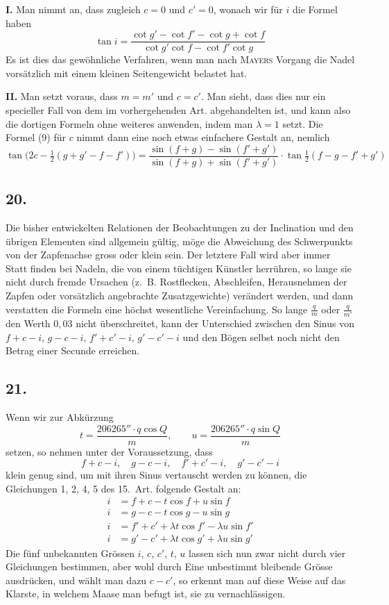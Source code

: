 \documentclass[12pt,a4paper]{article}
\begin{document}
\textbf{I.} Man nimmt an, dass zugleich $c = 0$ und $c' = 0$, wonach wir für $i$ die Formel haben
\[ \tan i = \frac{\cot g' - \cot f' - \cot g + \cot f}{\cot g' \cot f - \cot f' \cot g} \]
Es ist dies das gewöhnliche Verfahren, wenn man nach \textsc{Mayers} Vorgang die Nadel vorsätzlich mit einem kleinen Seitengewicht belastet hat.

\textbf{II.} Man setzt voraus, dass $m = m'$ und $c = c'$. Man sieht, dass dies nur ein specieller Fall von dem im vorhergehenden Art. abgehandelten ist, und kann also die dortigen Formeln ohne weiteres anwenden, indem man $\lambda = 1$ setzt. Die Formel (9) für $c$ nimmt dann eine noch etwas einfachere Gestalt an, nemlich
\[ \tan\bigl(2c - \tfrac{1}{2}(g + g' - f - f')\bigr) = \frac{\sin(f + g) - \sin(f' + g')}{\sin(f + g) + \sin(f' + g')} \cdot \tan\tfrac{1}{2}(f - g - f' + g') \]

\subsection*{20.}
Die bisher entwickelten Relationen der Beobachtungen zu der Inclination und den übrigen Elementen sind allgemein gültig, möge die Abweichung des Schwerpunkts von der Zapfenachse gross oder klein sein. Der letztere Fall wird aber immer Statt finden bei Nadeln, die von einem tüchtigen Künstler herrühren, so lange sie nicht durch fremde Ursachen (z.~B. Rostflecken, Abschleifen, Herausnehmen der Zapfen oder vorsätzlich angebrachte Zusatzgewichte) verändert werden, und dann verstatten die Formeln eine höchst wesentliche Vereinfachung. So lange $\frac{q}{m}$ oder $\frac{q}{m'}$ den Werth $0{,}03$ nicht überschreitet, kann der Unterschied zwischen den Sinus von $f + c - i$, $g - c - i$, $f' + c' - i$, $g' - c' - i$ und den Bögen selbst noch nicht den Betrag einer Secunde erreichen.

\subsection*{21.}
Wenn wir zur Abkürzung
\[ t = \frac{206265'' \cdot q \cos Q}{m}, \qquad u = \frac{206265'' \cdot q \sin Q}{m} \]
setzen, so nehmen unter der Voraussetzung, dass
\[ f + c - i, \quad g - c - i, \quad f' + c' - i, \quad g' - c' - i \]
klein genug sind, um mit ihren Sinus vertauscht werden zu können, die Gleichungen 1, 2, 4, 5 des 15.~Art. folgende Gestalt an:
\begin{align*}
i &= f + c - t \cos f + u \sin f \\
i &= g - c - t \cos g - u \sin g \\
i &= f' + c' + \lambda t \cos f' - \lambda u \sin f' \\
i &= g' - c' + \lambda t \cos g' + \lambda u \sin g'
\end{align*}
Die fünf unbekannten Grössen $i$, $c$, $c'$, $t$, $u$ lassen sich nun zwar nicht durch vier Gleichungen bestimmen, aber wohl durch Eine unbestimmt bleibende Grösse ausdrücken, und wählt man dazu $c - c'$, so erkennt man auf diese Weise auf das Klarste, in welchem Maase man befugt ist, sie zu vernachlässigen.
\end{document}
